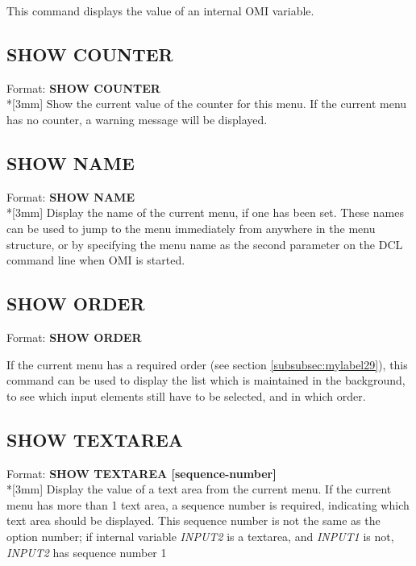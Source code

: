 \documentclass[a4paper]{book}
\newcommand{\vs}{\vspace{3mm}}
\renewcommand{\indent}{\hspace*{5mm}}
\begin{document}
This command displays the value of an internal OMI variable.

\subsection{SHOW COUNTER}
\label{subsubsec:mylabel80}

\indent Format: \textbf{SHOW COUNTER}\\*[3mm]
Show the current value of the counter for this menu. If the current menu has 
no counter, a warning message will be displayed.

\subsection{SHOW NAME}
\label{subsubsec:mylabel81}

\indent Format: \textbf{SHOW NAME}\\*[3mm]
Display the name of the current menu, if one has been set. These names can 
be used to jump to the menu immediately from anywhere in the menu structure, 
or by specifying the menu name as the second parameter on the DCL command 
line when OMI is started.

\subsection{SHOW ORDER}
\label{subsubsec:mylabel82}

\indent Format: \textbf{SHOW ORDER}

\vs

If the current menu has a required order (see section 
\ref{subsubsec:mylabel29}), this command can be used to display the 
list which is maintained in the background, to see which input elements 
still have to be selected, and in which order.

\subsection{SHOW TEXTAREA}
\label{subsubsec:mylabel83}

\indent Format: \textbf{SHOW TEXTAREA [sequence-number]}\\*[3mm]
Display the value of a text area from the current menu. If the current menu 
has more than 1 text area, a sequence number is required, indicating which 
text area should be displayed. This sequence number is not the same as the 
option number; if internal variable \textsl{INPUT2} is a textarea, and \textsl{INPUT1} is not, 
\textsl{INPUT2} has sequence number 1
\end{document}
